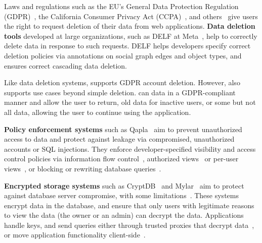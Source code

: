 %
Laws and regulations such as the EU's General Data Protection Regulation
(GDPR)~\cite{eu:gdpr}, the California Consumer Privacy Act (CCPA)~\cite{ccpa},
and others~\cite{va:privacy-act, china:gdpr-like} give users the right to
request deletion of their data from web applications.
%
\textbf{Data deletion tools} developed at large organizations, such as DELF at
Meta~\cite{delf}, help to correctly delete data in response to such requests.
%
DELF helps developers specify correct deletion policies via annotations on
social graph edges and object types, and ensures correct cascading data
deletion.
%

%
Like data deletion systems, \sys supports GDPR account deletion.
However, \sys also supports use cases beyond simple deletion.
%
\sys can \xx data in a GDPR-compliant manner and allow the user to return, \xx
old data for inactive users, or \xx some but not all data, allowing the user to
continue using the application.
%
%

%
\textbf{Policy enforcement systems} such as Qapla~\cite{qapla} aim to prevent
unauthorized access to data and protect against leakage via compromised,
unauthorized accounts or SQL injections.
%
They enforce developer-specified visibility and access control policies via
information flow control~\cite{static, jeeves, jif, hails, ifdb}, authorized
views~\cite{oracle} or per-user views~\cite{multiverse}, or blocking or
rewriting database queries~\cite{blockaid, qapla, sieve}.
%
%
%
%
%

\textbf{Encrypted storage systems} such as CryptDB~\cite{cryptdb} and
Mylar~\cite{mylar} aim to protect against database server compromise,
with some limitations~\cite{grubbs}.
%
These systems encrypt data in the database, and ensure that only
users with legitimate reasons to view the data (\ie the owner or an
admin) can decrypt the data.
%
Applications handle keys, and send queries either through
trusted proxies that decrypt data~\cite{cryptdb}, or move application
functionality client-side~\cite{mylar}.
%

